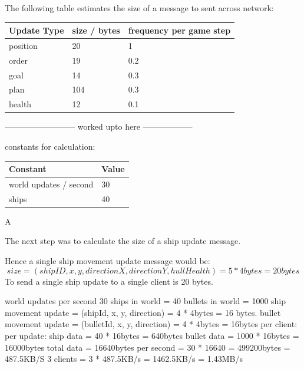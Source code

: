 The following table estimates the size of a message to sent across network:
\begin{center}
    \begin{tabular}{| l | l | l |}
    \hline
    Update Type & size / bytes & frequency per game step \\ \hline
    position & 20 & 1 \\ \hline
    order & 19 & 0.2 \\ \hline
    goal & 14 & 0.3 \\ \hline
    plan & 104 & 0.3 \\ \hline
    health & 12 & 0.1 \\ 
    \hline
    \end{tabular}
\end{center}

-------------------------- worked upto here ------------------


constants for calculation:
\begin{center}
    \begin{tabular}{| l | l |}
    \hline
    Constant & Value \\ \hline
    world updates / second & 30 \\ \hline
    ships & 40 \\
    \hline
    \end{tabular}
\end{center}

A 

The next step was to calculate the size of a ship update message.

Hence a single ship movement update message would be:
$$ size = (shipID, x, y, directionX, directionY, hullHealth) = 5 * 4 bytes = 20 bytes $$
To send a single ship update to a single client is 20 bytes.



			world updates per second 30
			ships in world = 40
			bullets in world = 1000
			ship movement update = (shipId, x, y, direction) = 4 * 4bytes = 16 bytes.
			bullet movement update = (bulletId, x, y, direction) = 4 * 4bytes = 16bytes
			per client:
				per update:
 					ship data = 40 * 16bytes = 640bytes
					bullet data = 1000 * 16bytes = 16000bytes
					total data = 16640bytes
			    per second = 30 * 16640 = 499200bytes = 487.5KB/S
			3 clients = 3 * 487.5KB/s = 1462.5KB/s = 1.43MB/s




